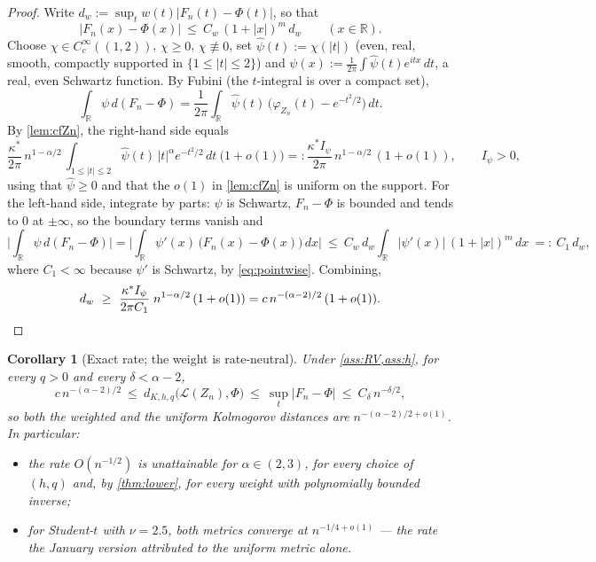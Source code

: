 \documentclass[11pt,a4paper]{article}
\theoremstyle{plain}
\newtheorem{corollary}[theorem]{Corollary}
\theoremstyle{definition}
\theoremstyle{remark}
\numberwithin{equation}{section}
\newcommand{\R}{\mathbb{R}}
\newcommand{\1}{\mathbbm{1}}
\newcommand{\h}{h}
\begin{document}
\begin{proof}
Write $d_w:=\sup_t w(t)|F_n(t)-\Phi(t)|$, so that
\begin{equation}\label{eq:pointwise}
|F_n(x)-\Phi(x)|\ \le\ C_w\,(1+|x|)^m\, d_w\qquad(x\in\R).
\end{equation}
Choose $\chi\in C_c^\infty((1,2))$, $\chi\ge0$, $\chi\not\equiv0$, set
$\widehat\psi(t):=\chi(|t|)$ (even, real, smooth, compactly supported in
$\{1\le|t|\le2\}$) and
$\psi(x):=\frac{1}{2\pi}\int\widehat\psi(t)e^{itx}\,dt$, a real, even Schwartz
function. By Fubini (the $t$-integral is over a compact set),
\begin{equation}\label{eq:parseval}
\int_\R \psi\,d(F_n-\Phi)
=\frac{1}{2\pi}\int_\R \widehat\psi(t)\,\big(\varphi_{Z_n}(t)-e^{-t^2/2}\big)\,dt .
\end{equation}
By \cref{lem:cfZn}, the right-hand side equals
\[
\frac{\kappa^\ast}{2\pi}\,n^{1-\alpha/2}\,
\int_{1\le|t|\le2}\widehat\psi(t)\,|t|^\alpha e^{-t^2/2}\,dt\ \big(1+o(1)\big)
=:\frac{\kappa^\ast I_\psi}{2\pi}\,n^{1-\alpha/2}\,(1+o(1)),
\qquad I_\psi>0,
\]
using that $\widehat\psi\ge0$ and that the $o(1)$ in \cref{lem:cfZn} is uniform on the
support. For the left-hand side, integrate by parts: $\psi$ is Schwartz, $F_n-\Phi$ is
bounded and tends to $0$ at $\pm\infty$, so the boundary terms vanish and
\[
\Big|\int_\R \psi\,d(F_n-\Phi)\Big|
=\Big|\int_\R \psi'(x)\,\big(F_n(x)-\Phi(x)\big)\,dx\Big|
\ \le\ C_w\,d_w \int_\R |\psi'(x)|\,(1+|x|)^m\,dx\ =:\ C_1\,d_w,
\]
where $C_1<\infty$ because $\psi'$ is Schwartz, by \eqref{eq:pointwise}. Combining,
\[
d_w\ \ge\ \frac{\kappa^\ast I_\psi}{2\pi C_1}\; n^{1-\alpha/2}\,(1+o(1))
= c\, n^{-(\alpha-2)/2}\,(1+o(1)) . \qedhere
\]
\end{proof}

\begin{corollary}[Exact rate; the weight is rate-neutral]\label{cor:exact}
Under \cref{ass:RV,ass:h}, for every $q>0$ and every $\delta<\alpha-2$,
\[
c\,n^{-(\alpha-2)/2}\ \le\ d_{K,\h,q}\big(\mathcal L(Z_n),\Phi\big)
\ \le\ \sup_t|F_n-\Phi|\ \le\ C_\delta\, n^{-\delta/2},
\]
so both the weighted and the uniform Kolmogorov distances are
$n^{-(\alpha-2)/2+o(1)}$. In particular:
\begin{itemize}
\item[(i)] the rate $O(n^{-1/2})$ is unattainable for $\alpha\in(2,3)$, for every
choice of $(\h,q)$ and, by \cref{thm:lower}, for every weight with polynomially
bounded inverse;
\item[(ii)] for Student-$t$ with $\nu=2.5$, both metrics converge at
$n^{-1/4+o(1)}$ --- the rate the January version attributed to the uniform metric
alone.
\end{itemize}
\end{corollary}
\end{document}
